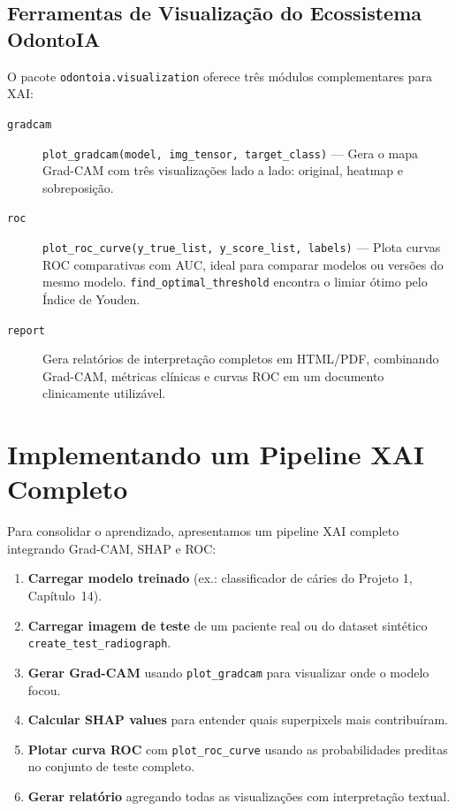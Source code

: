 
\subsection{Ferramentas de Visualização do Ecossistema OdontoIA}

O pacote \texttt{odontoia.visualization} oferece três módulos
complementares para XAI:

\begin{description}
  \item[\texttt{gradcam}] \texttt{plot\_gradcam(model, img\_tensor, target\_class)}
    — Gera o mapa Grad-CAM com três visualizações lado a lado: original,
    heatmap e sobreposição.

  \item[\texttt{roc}] \texttt{plot\_roc\_curve(y\_true\_list, y\_score\_list, labels)}
    — Plota curvas ROC comparativas com AUC, ideal para comparar modelos
    ou versões do mesmo modelo. \texttt{find\_optimal\_threshold} encontra
    o limiar ótimo pelo Índice de Youden.

  \item[\texttt{report}] Gera relatórios de interpretação completos em
    HTML/PDF, combinando Grad-CAM, métricas clínicas e curvas ROC em um
    documento clinicamente utilizável.
\end{description}

\section{Implementando um Pipeline XAI Completo}

Para consolidar o aprendizado, apresentamos um pipeline XAI completo
integrando Grad-CAM, SHAP e ROC:

\begin{enumerate}
  \item \textbf{Carregar modelo treinado} (ex.: classificador de cáries
    do Projeto 1, Capítulo~14).

  \item \textbf{Carregar imagem de teste} de um paciente real ou do
    dataset sintético \texttt{create\_test\_radiograph}.

  \item \textbf{Gerar Grad-CAM} usando \texttt{plot\_gradcam} para
    visualizar onde o modelo focou.

  \item \textbf{Calcular SHAP values} para entender quais superpixels
    mais contribuíram.

  \item \textbf{Plotar curva ROC} com \texttt{plot\_roc\_curve} usando
    as probabilidades preditas no conjunto de teste completo.

  \item \textbf{Gerar relatório} agregando todas as visualizações com
    interpretação textual.
\end{enumerate}

